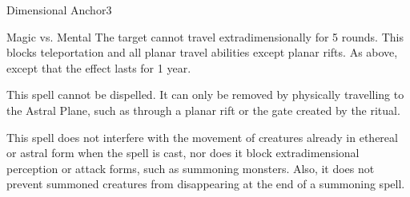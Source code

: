 \begin{spellsection}{Dimensional Anchor}{3}
    \begin{spellheader}
    \end{spellheader}
    \begin{spellcontent}
        \begin{spelltargetinginfo}
        \end{spelltargetinginfo}
        \begin{spelleffects}
            \begin{spellattack}{Magic vs. Mental}
                \spellsuccess  The target cannot travel extradimensionally for 5 rounds. This blocks teleportation and all planar travel abilities except planar rifts.
                \spellcritical As above, except that the effect lasts for 1 year.
            \end{spellattack}
        \end{spelleffects}
    \end{spellcontent}
    \begin{spellfooter}
        \spellnotes This spell cannot be dispelled. It can only be removed by physically travelling to the Astral Plane, such as through a planar rift or the gate created by the  ritual.

        This spell does not interfere with the movement of creatures already in ethereal or astral form when the spell is cast, nor does it block extradimensional perception or attack forms, such as summoning monsters. Also, it does not prevent summoned creatures from disappearing at the end of a summoning spell.
        \miscastrandom
    \end{spellfooter}
\end{spellsection}


